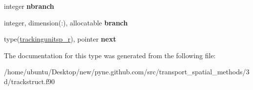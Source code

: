 \begin{DoxyCompactItemize}
\item 
integer {\bfseries nbranch}\hypertarget{structtracking__data__structures_1_1trackingunitsp__r_a5378c801096551d6d507eb04dd011a6c}{}\label{structtracking__data__structures_1_1trackingunitsp__r_a5378c801096551d6d507eb04dd011a6c}

\item 
integer, dimension(\+:), allocatable {\bfseries branch}\hypertarget{structtracking__data__structures_1_1trackingunitsp__r_a190f4625d2f13828b2f02ca184121c79}{}\label{structtracking__data__structures_1_1trackingunitsp__r_a190f4625d2f13828b2f02ca184121c79}

\item 
type(\hyperlink{structtracking__data__structures_1_1trackingunitsp__r}{trackingunitsp\+\_\+r}), pointer {\bfseries next}\hypertarget{structtracking__data__structures_1_1trackingunitsp__r_a24d8fb2d7521637baa6381200f4fd753}{}\label{structtracking__data__structures_1_1trackingunitsp__r_a24d8fb2d7521637baa6381200f4fd753}

\end{DoxyCompactItemize}


The documentation for this type was generated from the following file\+:\begin{DoxyCompactItemize}
\item 
/home/ubuntu/\+Desktop/new/pyne.\+github.\+com/src/transport\+\_\+spatial\+\_\+methods/3d/trackstruct.\+f90\end{DoxyCompactItemize}
